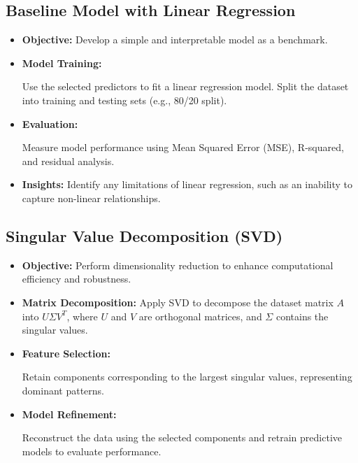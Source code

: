 \documentclass[english,12pt, titlepage]{article}
\begin{document}
	\subsection{Baseline Model with Linear Regression}
	\begin{itemize}
		\item \textbf{Objective:} Develop a simple and interpretable model as a benchmark.
		\item \textbf{Model Training:}
		
		Use the selected predictors to fit a linear regression model.
		Split the dataset into training and testing sets (e.g., 80/20 split).
		\item 	\textbf{Evaluation:}
		
		Measure model performance using Mean Squared Error (MSE), R-squared, and residual analysis.
		
		\item 	\textbf{Insights:} Identify any limitations of linear regression, such as an inability to capture non-linear relationships.
		
	\end{itemize}
	
	\subsection{Singular Value Decomposition (SVD)}
	\begin{itemize}
		\item 	\textbf{Objective:} Perform dimensionality reduction to enhance computational efficiency and robustness.
		\item \textbf{Matrix Decomposition:} Apply SVD to decompose the dataset matrix $A$ into $U \Sigma V^{T}$, where $U$ and $V$ are orthogonal matrices, and $\Sigma$ contains the singular values.
		
		\item 
		\textbf{	Feature Selection:}
		
		Retain components corresponding to the largest singular values, representing dominant patterns.
		\item \textbf{Model Refinement:}
		
		Reconstruct the data using the selected components and retrain predictive models to evaluate performance.
	\end{itemize}
	
\end{document}
